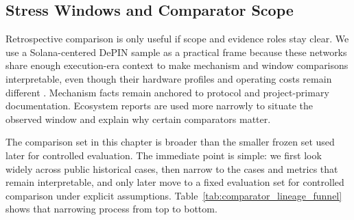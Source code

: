 \subsection{Stress Windows and Comparator Scope}
Retrospective comparison is only useful if scope and evidence roles stay clear. We use a Solana-centered DePIN sample as a practical frame because these networks share enough execution-era context to make mechanism and window comparisons interpretable, even though their hardware profiles and operating costs remain different \cite{FrontiersDePIN2025, Messari2024}. Mechanism facts remain anchored to protocol and project-primary documentation. Ecosystem reports are used more narrowly to situate the observed window and explain why certain comparators matter.

The comparison set in this chapter is broader than the smaller frozen set used later for controlled evaluation. The immediate point is simple: we first look widely across public historical cases, then narrow to the cases and metrics that remain interpretable, and only later move to a fixed evaluation set for controlled comparison under explicit assumptions. Table~\ref{tab:comparator_lineage_funnel} shows that narrowing process from top to bottom.

